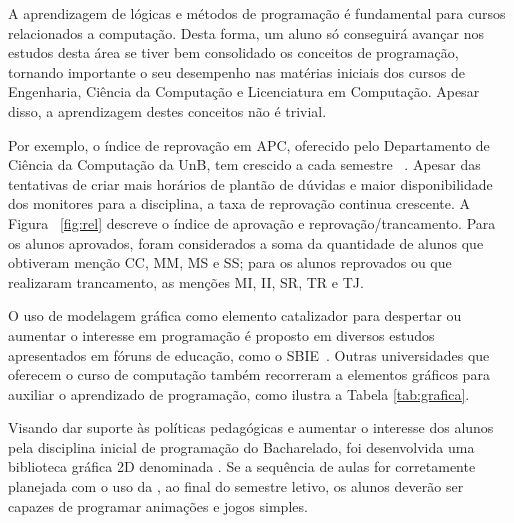 A aprendizagem de lógicas e métodos de programação é fundamental para cursos relacionados a computação. Desta forma, um aluno só conseguirá avançar nos estudos desta área se tiver bem consolidado os conceitos de programação, tornando importante o seu desempenho nas matérias iniciais dos cursos de Engenharia, Ciência da Computação e Licenciatura em Computação. Apesar disso, a aprendizagem destes conceitos não é trivial.

Por exemplo, o índice de reprovação em \acrfull{APC}, oferecido pelo Departamento  de  Ciência  da  Computação  da  \acrfull{UnB},  tem
crescido    a    cada   semestre   ~\cite{mineracao}. Apesar das  tentativas de criar mais horários
de plantão de dúvidas e maior disponibilidade dos monitores para a
disciplina,  a taxa de reprovação continua crescente. A
Figura ~\ref{fig:rel} descreve o índice de aprovação e reprovação/trancamento.  Para os alunos aprovados, foram considerados a
soma da  quantidade de alunos  que obtiveram menção  CC, MM, MS  e SS; para os alunos reprovados ou que realizaram trancamento, as menções MI, II, SR, TR e TJ.

%



O  uso de  modelagem  gráfica como  elemento catalizador para  despertar ou aumentar  o interesse em  programação é proposto em diversos estudos apresentados em fóruns de educação, como o SBIE~\cite{sbie2010a}. Outras universidades que oferecem o curso de computação também recorreram a elementos gráficos para auxiliar o aprendizado de programação, como ilustra a Tabela \ref{tab:grafica}.

Visando dar  suporte às políticas  pedagógicas e aumentar  o interesse dos alunos pela disciplina inicial de programação do Bacharelado, foi desenvolvida uma biblioteca gráfica  2D  denominada  \playAPC. Se a sequência de aulas for corretamente planejada com o  uso da \playAPC, ao final do semestre  letivo, os alunos deverão ser  capazes de programar animações e jogos simples.  


